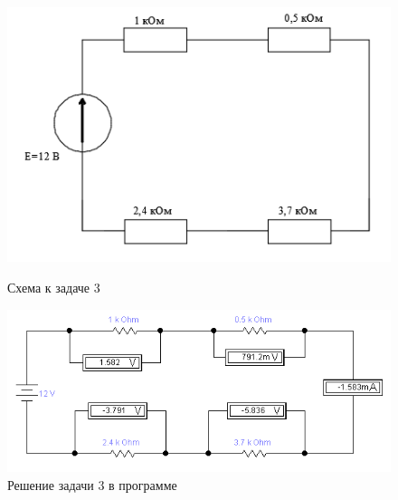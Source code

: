 \begin{figure}[H]
  \begin{center}
    \begin{minipage}[h]{0.4\linewidth}
        \includegraphics[width=1\textwidth]{authors/stepanuk-2-fig-7.png}
        \caption{Схема к задаче 3}
        \label{fig:stepanuk-2-fig-7}
    \end{minipage}
\hfill
    \begin{minipage}[h]{0.55\linewidth}
        \includegraphics[width=1\textwidth]{authors/stepanuk-2-fig-8.png}
        \caption{Решение задачи 3 в программе}
        \label{fig:stepanuk-2-fig-8}
    \end{minipage}


  \end{center}

\end{figure}
